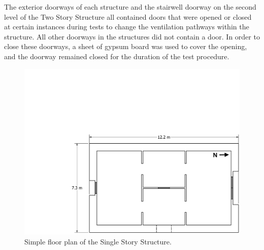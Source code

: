 \documentclass[12pt,oneside]{book}
\begin{document}
The exterior doorways of each structure and the stairwell doorway on the second level of the Two Story Structure all contained doors that were opened or closed at certain instances during tests to change the ventilation pathways within the structure. All other doorways in the structures did not contain a door. In order to close these doorways, a sheet of gypsum board was used to cover the opening, and the doorway remained closed for the duration of the test procedure.
\clearpage

\begin{figure}[!ht]
	\includegraphics[width=\columnwidth]{../Figures/Floor_Plans/East_Test_Structure_Dimensioned_LxW}
	\caption[Simple floor plan of the Single Story Structure.]{Simple floor plan of the Single Story Structure.}
	\label{fig:east_dimensioned_plan}
\end{figure}
\end{document}
